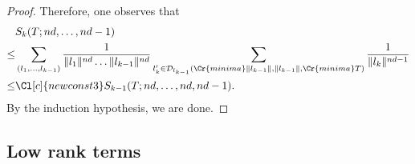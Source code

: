 \documentclass{amsart}
\theoremstyle{definition}
\theoremstyle{remark}
\begin{document}
\begin{proof}
Therefore, one observes that
\begin{align}
    & S_{k}(T; nd, \dots, nd-1)  \\
    \leq & 
    \sum_{ (l_{1},\dots,l_{k-1})}^{} \frac{1}{ \|l_{1}\|^{nd} \dots \|l_{k-1}\|^{nd}} 
    \sum_{l_{k}' \in  \mathcal{D}_{l_{k-1}}(\Cr{minima}\|l_{k-1}\|, \|l_{k-1}\|, \Cr{minima} T )}  \frac{1}{\|l_{k}\|^{nd-1}} \\
    \leq & 
    \Cl[c]{newconst3}
    S_{k-1}(T;nd,\dots,nd,nd-1) .
\end{align}
By the induction hypothesis, we are done.


\end{proof}

\fi


\subsection{Low rank terms}


\end{document}
